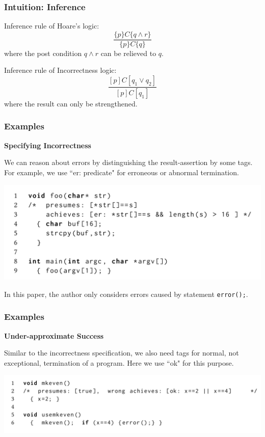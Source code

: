 \documentclass[11pt]{beamer}
\begin{document}
\begin{frame}\frametitle{Intuition: Inference}
Inference rule of Hoare's logic:
\[\dfrac{\{p\}C\{q\wedge r\}}{\{p\}C\{q\}}\]
where the post condition $q\wedge r$ can be relieved to $q$.

Inference rule of Incorrectness logic:
\[\dfrac{[p]C[q_1 \vee q_2]}{[p]C [q_1]}\]
where the result can only be strengthened. 
\end{frame}

\begin{frame}\frametitle{Examples}
\textbf{Specifying Incorrectness}

We can reason about errors by distinguishing the result-assertion by some tags.
For example, we use ``er: predicate" for erroneous or abnormal termination.
\begin{center}

\includegraphics[scale = 0.35]{5.png}

\end{center} 
In this paper, the author only considers errors caused by statement \texttt{error();}.
\end{frame}

\begin{frame}\frametitle{Examples}
\textbf{Under-approximate Success}

Similar to the incorrectness specification, we also need tags for normal, not exceptional, termination of a program. Here we use ``ok" for this purpose.
\begin{center}

\includegraphics[scale = 0.35]{6.png}

\end{center} 
\end{frame}
\end{document}
